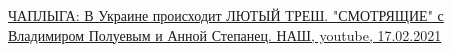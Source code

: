  
 
 
 
 

\href{https://www.youtube.com/watch?v=ioDMH8m7cQY}{%
ЧАПЛЫГА: В Украине происходит ЛЮТЫЙ ТРЕШ. "СМОТРЯЩИЕ" с Владимиром Полуевым и Анной Степанец. НАШ,%
youtube, 17.02.2021%
}


